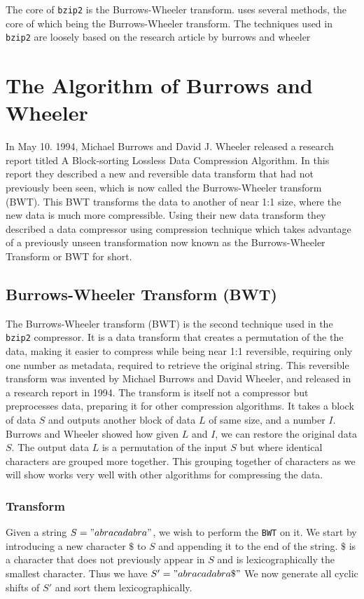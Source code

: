 \documentclass{article}
\begin{document}
The core of \texttt{bzip2} is the Burrows-Wheeler transform. uses several methods, the core of which being the Burrows-Wheeler transform. The techniques used in \texttt{bzip2} are loosely based on the research article by burrows and wheeler %

\section{The Algorithm of Burrows and Wheeler}
In May 10. 1994, Michael Burrows and David J. Wheeler released a research report titled A Block-sorting Lossless Data Compression Algorithm. In this report they described a new and reversible data transform that had not previously been seen, which is now called the Burrows-Wheeler transform (BWT). This BWT transforms the data to another of near 1:1 size, where the new data is much more compressible.
Using their new data transform they described a data compressor using 
compression technique which takes advantage of a previously unseen transformation now known as the Burrows-Wheeler Transform or BWT for short.


\subsection{Burrows-Wheeler Transform (BWT)}
The Burrows-Wheeler transform (BWT) is the second technique used in the \texttt{bzip2} compressor. It is a data transform that creates a permutation of the the data, making it easier to compress while being near 1:1 reversible, requiring only one number as metadata, required to retrieve the original string. 
This reversible transform was invented by Michael Burrows and David Wheeler, and released in a research report in 1994. The transform is itself not a compressor but preprocesses data, preparing it for other compression algorithms. It takes a block of data \(S\) and outputs another block of data \(L\) of same size, and a number \(I\). 
Burrows and Wheeler showed how given \(L\) and \(I\), we can restore the original data \(S\). The output data \(L\) is a permutation of the input \(S\) but where identical characters are grouped more together. This grouping together of characters as we will show works very well with other algorithms for compressing the data.
\subsubsection{Transform}
Given a string \(S = "abracadabra"\), we wish to perform the \texttt{BWT} on it. We start by introducing a new character \(\$\) to \(S\) and appending it to the end of the string. \(\$\) is a character that does not previously appear in \(S\) and is lexicographically the smallest character. Thus we have \(S' = "abracadabra\$"\) %
We now generate all cyclic shifts of \(S'\) and sort them lexicographically.
\end{document}
